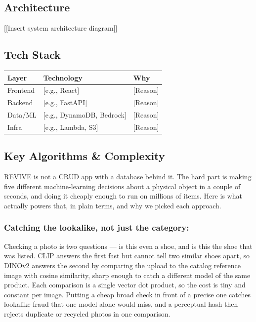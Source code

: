 \documentclass[11pt]{article}
\newcommand{\placeholder}[1]{{\color{placeGray} #1}}
\begin{document}
\subsection{Architecture}
\placeholder{[[Insert system architecture diagram]]}

\subsection{Tech Stack}
\renewcommand{\arraystretch}{1.4}
\begin{tabularx}{\textwidth}{|L{0.22\textwidth}|L{0.40\textwidth}|X|}
\hline
{}
{\color{white}\bfseries Layer} & {\color{white}\bfseries Technology} & {\color{white}\bfseries Why} \\ \hline
Frontend & [e.g., React] & [Reason] \\ \hline
{}
Backend & [e.g., FastAPI] & [Reason] \\ \hline
Data/ML & [e.g., DynamoDB, Bedrock] & [Reason] \\ \hline
{}
Infra & [e.g., Lambda, S3] & [Reason] \\ \hline
\end{tabularx}

\subsection{Key Algorithms \& Complexity}

\placeholder{REVIVE is not a CRUD app with a database behind it. The hard part is making five different machine-learning decisions about a physical object in a couple of seconds, and doing it cheaply enough to run on millions of items. Here is what actually powers that, in plain terms, and why we picked each approach.}


\subsubsection*{\color{amznSlate} Catching the lookalike, not just the category:}
\placeholder{Checking a photo is two questions --- is this even a shoe, and is this the shoe that was listed. CLIP answers the first fast but cannot tell two similar shoes apart, so DINOv2 answers the second by comparing the upload to the catalog reference image with cosine similarity, sharp enough to catch a different model of the same product. Each comparison is a single vector dot product, so the cost is tiny and constant per image. Putting a cheap broad check in front of a precise one catches lookalike fraud that one model alone would miss, and a perceptual hash then rejects duplicate or recycled photos in one comparison.}
\end{document}
